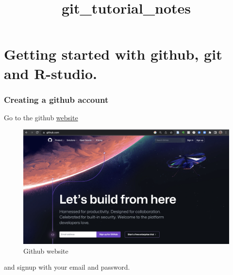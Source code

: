 \documentclass[
  letterpaper,
  DIV=11,
  numbers=noendperiod]{scrartcl}
\title{git\_tutorial\_notes}
\author{}
\date{}
\begin{document}
\maketitle
\ifdefined\Shaded\renewenvironment{Shaded}{\begin{tcolorbox}[interior hidden, enhanced, frame hidden, boxrule=0pt, breakable, sharp corners, borderline west={3pt}{0pt}{shadecolor}]}{\end{tcolorbox}}\fi

\hypertarget{getting-started-with-github-git-and-r-studio.}{%
\section{Getting started with github, git and
R-studio.}\label{getting-started-with-github-git-and-r-studio.}}

\hypertarget{creating-a-github-account}{%
\subsubsection{Creating a github
account}\label{creating-a-github-account}}

Go to the github \href{http://github.com}{website}

\begin{figure}

{\centering \includegraphics{figures/1.PNG}

}

\caption{Github website}

\end{figure}

and signup with your email and password.
\end{document}

